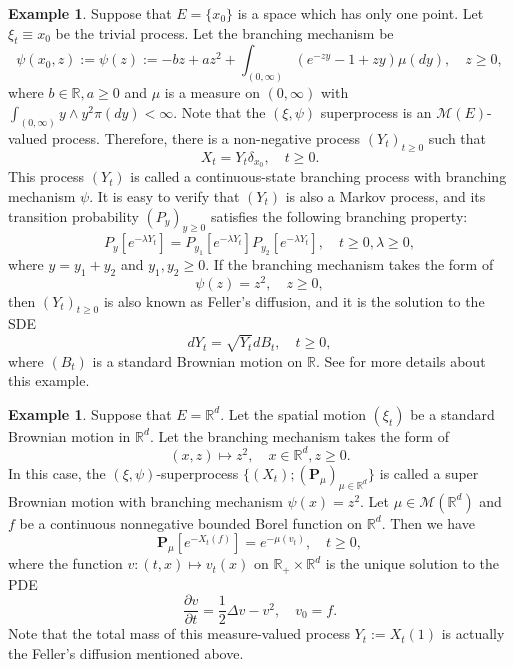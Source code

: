 \documentclass[UTF8]{pkuthss}
\theoremstyle{plain}
\theoremstyle{definition}
\newtheorem{exa}[thm]{Example}
\numberwithin{equation}{section}
\begin{document}
\begin{exa}
	Suppose that $E=\{x_0\}$ is a space which has only one point. Let $\xi_t \equiv x_0$ be the trivial process. Let the branching mechanism be
\begin{equation}
\label{eq: psi for CSBP}
	\psi(x_0,z):=\psi(z) := -b z + a z^2 + \int_{(0,\infty)}(e^{-zy}-1+zy)\mu(dy) ,\quad z\geq 0,
\end{equation}
	where $b\in \mathbb R, a \geq 0$ and $\mu$ is a measure on $(0,\infty)$ with $\int_{(0,\infty)} y \wedge y^2 \pi(dy) < \infty$. 
	Note that the $(\xi,\psi)$ superprocess is an $\mathcal M(E)$-valued process. Therefore, there is a non-negative process $(Y_t)_{t\geq 0}$ such that
\[
	X_t = Y_t \delta_{x_0},\quad t\geq 0.
\]
	This process $(Y_t)$ is called a continuous-state branching process with branching mechanism $\psi$.
	It is easy to verify that $(Y_t)$ is also a Markov process, and its transition probability $(P_y)_{y\geq 0}$ satisfies the following branching property:
\[
	P_y[e^{-\lambda Y_t}] = P_{y_1}[e^{-\lambda Y_t}] P_{y_2}[e^{-\lambda Y_t}],\quad t\geq 0,\lambda \geq 0,
\]  
	where $y = y_1+y_2$ and $y_1,y_2\geq 0$. 
	If the branching mechanism takes the form of 
\begin{equation}
\label{eq: branching mechanism for CSBP}
	\psi(z) = z^2, \quad z\geq 0,
\end{equation}
	then $(Y_t)_{t\geq 0}$ is also known as Feller's diffusion, and it is the solution to the SDE
\[
	dY_t = \sqrt{Y_t} dB_t, \quad t\geq 0,
\]
	where $(B_t)$ is a standard Brownian motion on $\mathbb R$.
	See \cite{Li2011MeasureValued} for more details about this example.
\end{exa}

\begin{exa}
	Suppose that $E = \mathbb R^d$. Let the spatial motion $(\xi_t)$ be a standard Brownian motion in $\mathbb R^d$. Let the branching mechanism takes the form of
\[
	(x,z) \mapsto z^{2}, \quad x\in \mathbb R^d, z\geq 0.
\]
	In this case, the $(\xi,\psi)$-superprocess $\{(X_t);(\mathbf P_\mu)_{\mu \in \mathbb R^d}\}$ is called a super Brownian motion with branching mechanism $\psi(x)=z^2$. Let $\mu \in \mathcal M(\mathbb R^d)$ and $f$ be a continuous nonnegative bounded Borel function on $\mathbb R^d$.
	Then we have
\[
	\mathbf P_\mu[e^{- X_t(f)}] = e^{-\mu(v_t)},\quad t\geq 0,
\]
	where the function $v:(t,x)\mapsto v_t(x)$ on $\mathbb R_+\times \mathbb R^d$ is the unique solution to the PDE
\[
	\frac{\partial v}{\partial t} = \frac{1}{2} \Delta v - v^{2},
	\quad v_0 = f. 
\]
	Note that the total mass of this measure-valued process $Y_t:=X_t(1)$ is actually the Feller's diffusion mentioned above.
\end{exa}
	
\end{document}
